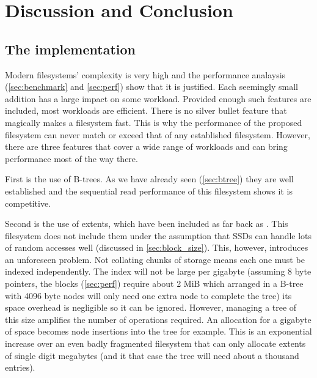 \chapter{Discussion and Conclusion}

    \section{The implementation}
        \label{sec:implementation_discussion}

        Modern filesystems' complexity is very high and the performance
        analaysis (\autoref{sec:benchmark} and \autoref{sec:perf}) show that it is
        justified. Each seemingly small addition has a large impact on some
        workload. Provided enough such features are included, most workloads
        are efficient. There is no silver bullet feature that magically makes a
        filesystem fast. This is why the performance of the proposed filesystem
        can never match or exceed that of any established filesystem. However,
        there are three features that cover a wide range of workloads and can
        bring performance most of the way there.

        First is the use of B-trees. As we have already seen (\autoref{sec:btree})
        they are well established and the sequential read performance of this
        filesystem shows it is competitive.

        Second is the use of extents, which have been included as far back as
        . This filesystem does not include them under the
        assumption that SSDs can handle lots of random accesses well (discussed
        in \autoref{sec:block_size}). This, however, introduces an unforeseen
        problem. Not collating chunks of storage means each one must be indexed
        independently. The index will not be large per gigabyte (assuming 8
        byte pointers, the  blocks (\autoref{sec:perf}) require
        about 2 MiB which arranged in a B-tree with 4096 byte nodes will only
        need one extra node to complete the tree) its space overhead is
        negligible so it can be ignored. However, managing a tree of this size
        amplifies the number of operations required. An allocation for a
        gigabyte of space becomes  node insertions into the
        tree for example. This is an exponential increase over an even badly
        fragmented filesystem that can only allocate extents of single digit
        megabytes (and it that case the tree will need about a thousand
        entries).

